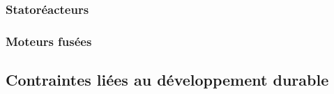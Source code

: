 		\subsubsection{Statoréacteurs}
	
		\subsubsection{Moteurs fusées}
		
	\subsection{Contraintes liées au développement durable}
